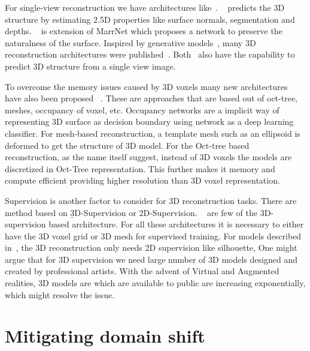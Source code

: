 For single-view reconstruction we have architectures like~\cite{wu2017marrnet,z-gan, Yang_219, wu2018learning, popov2020corenet}.
~\cite{wu2017marrnet} predicts the 3D structure by estimating 2.5D properties like surface normals, segmentation and depths.
~\cite{wu2018learning} is extension of MarrNet which proposes a network to preserve the naturalness of the surface.
Inspired by generative models~\cite{Goodfellow2014GenerativeAN,kingma2014autoencoding}, many 3D reconstruction architectures were published~\cite{z-gan, Yang_219,wu2017learning,Lunz2020InverseGG}.
Both~\cite{Xie_2019, Xie_2020} also have the capability to predict 3D structure from a single view image.

To overcome the memory issues caused by 3D voxels many new architectures have also been proposed
~\cite{tatarchenko2017octree,Richter2018MatryoshkaNP,Mescheder2019OccupancyNL,Gkioxari2019MeshR, wang2018pixel2mesh,groueix2018atlasnet,pan2019deep}.
These are approaches that are based out of oct-tree, meshes, occupancy of voxel, etc.
Occupancy networks are a implicit way of representing 3D surface as decision boundary using network as a deep learning classifier.
For mesh-based reconstruction, a template mesh such as an ellipsoid is deformed to get the structure of 3D model.
For the Oct-tree based reconstruction, as the name itself suggest, instead of 3D voxels the models are discretized in Oct-Tree representation.
This further makes it memory and compute efficient providing higher resolution than 3D voxel representation.

Supervision is another factor to consider for 3D reconstruction tasks.
There are method based on \b{3D-Supervision or 2D-Supervision}.
~\cite{Xie_2019,Xie_2020,wu2017marrnet,groueix2018atlasnet,pan2019deep, chen2019learning} are few of the 3D-supervision based architecture.
For all these architectures it is necessary to either have the 3D voxel grid or 3D mesh for supervised training.
For models described in~\cite{Lunz2020InverseGG,henderson2019learning}, the 3D reconstruction only needs 2D supervision like silhouette,
One might argue that for 3D supervision we need large number of 3D models designed and created by professional artists.
With the advent of Virtual and Augmented realities, 3D models are which are available to public are increasing exponentially, which might resolve the issue.


\section{Mitigating domain shift}\label{sec:mitigating_domain_shift}

